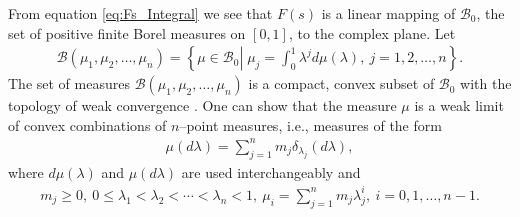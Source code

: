 \documentclass[english,12pt]{ttuthes}
\begin{document}
From equation \eqref{eq:Fs_Integral} we see that $F(s)$ is a linear
mapping of $\mathscr{B}_0$, the set of positive finite Borel measures on
$[0,1]$, to the complex plane. Let
%
\begin{align}\label{eq:Set_of_mu_Measures}
  \mathscr{B}(\mu_1,\mu_2,\ldots,\mu_n)=
     \left\{\mu\in\mathscr{B}_0 \left|\right. \; \mu_j=\int_0^1\lambda^jd\mu(\lambda), \ j=1,2,\ldots,n\right\}. 
\end{align}
%
The set of measures $\mathscr{B}(\mu_1,\mu_2,\ldots,\mu_n)$ is a compact, convex
subset of $\mathscr{B}_0$ with the topology of weak convergence
\cite{Golden:CMP-473}. One can show that the measure $\mu$ is a weak
limit of convex combinations of $n$--point measures, i.e., measures of
the form  \cite{Golden:CMP-473} 
%
\begin{align}\label{eq:mu_measure}
  \mu(d\lambda)=\sum_{j=1}^{n}m_j\delta_{\lambda_j}(d\lambda),
\end{align}
%
where $d\mu(\lambda)$ and $\mu(d\lambda)$ are used interchangeably and
%
\begin{align}\label{eq:mu_properties}
  m_j\geq0, \ 0\leq\lambda_1<\lambda_2<\cdots<\lambda_{n}<1, \ \mu_i=\sum_{j=1}^{n}m_j\lambda_j^i, \ i=0,1,\ldots,n-1.
\end{align}
%
\end{document}
